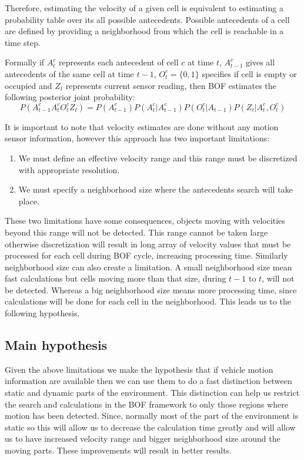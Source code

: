 Therefore, estimating the velocity of a given cell is equivalent to estimating a probability table over its all possible antecedents. Possible antecedents of a cell are defined by providing a neighborhood from which the cell is reachable in a time step.

Formally if $A_t^c$ represents each antecedent of cell $c$ at time $t$, $A_{t-1}^c$ gives all antecedents of the same cell at time $t-1$, $O_t^c=\{0,1\}$ specifies if cell is empty or occupied and $Z_t$ represents current sensor reading, then BOF estimates the following posterior joint probability:
\begin{equation}
P(A_{t-1}^c A_t^c O_t^c Z_t) = P(A_{t-1}^c)P(A_t^c|A_{t-1}^c)P(O_t^c|A_{t-1})P(Z_t|A_t^c,O_t^c)
\end{equation}

It is important to note that velocity estimates are done without any motion sensor information, however this approach has two important limitations:
\begin{enumerate}
\item We must define an effective velocity range and this range must be discretized with appropriate resolution.
\item We must specify a neighborhood size where the antecedents search will take place.
\end{enumerate}
These two limitations have some consequences, objects moving with velocities beyond this range will not be detected. This range cannot be taken large otherwise discretization will result in long array of velocity values that must be processed for each cell during BOF cycle, increasing processing time. Similarly neighborhood size can also create a limitation. A small neighborhood size mean fast calculations but cells moving more than that size, during $t-1$ to $t$, will not be detected. Whereas a big neighborhood size means more processing time, since calculations will be done for each cell in the neighborhood. This leads us to the following hypothesis.

\subsection{Main hypothesis}
Given the above limitations we make the hypothesis that if vehicle motion information are available then we can use them to do a fast distinction between static and dynamic parts of the environment. This distinction can help us restrict the search and calculations in the BOF framework to only those regions where motion has been detected. Since, normally most of the part of the environment is static so this will allow us to decrease the calculation time greatly and will allow us to have increased velocity range and bigger neighborhood size around the moving parts. These improvements will result in better results.

